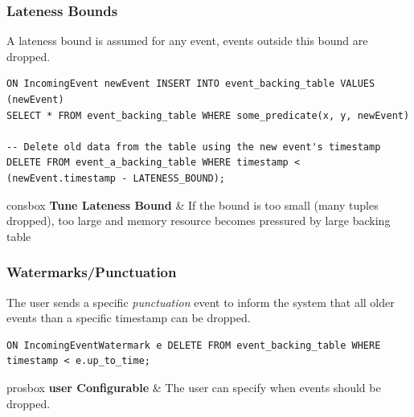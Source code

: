 \subsubsection{Lateness Bounds}
A lateness bound is assumed for any event, events outside this bound are dropped.
\begin{verbatim}
ON IncomingEvent newEvent INSERT INTO event_backing_table VALUES (newEvent)
SELECT * FROM event_backing_table WHERE some_predicate(x, y, newEvent)

-- Delete old data from the table using the new event's timestamp
DELETE FROM event_a_backing_table WHERE timestamp < (newEvent.timestamp - LATENESS_BOUND);
\end{verbatim}
\begin{tabbox}[.7\textwidth]{consbox}
    \textbf{Tune Lateness Bound} & If the bound is too small (many tuples dropped), too large and memory resource becomes pressured by large backing table \\
\end{tabbox}

\subsubsection{Watermarks/Punctuation}
The user sends a specific \textit{punctuation} event to inform the system that all older events than a specific timestamp can be dropped.
\begin{verbatim}
ON IncomingEventWatermark e DELETE FROM event_backing_table WHERE timestamp < e.up_to_time;
\end{verbatim}
\begin{tabbox}[.7\textwidth]{prosbox}
    \textbf{user Configurable} & The user can specify when events should be dropped. \\
\end{tabbox}

